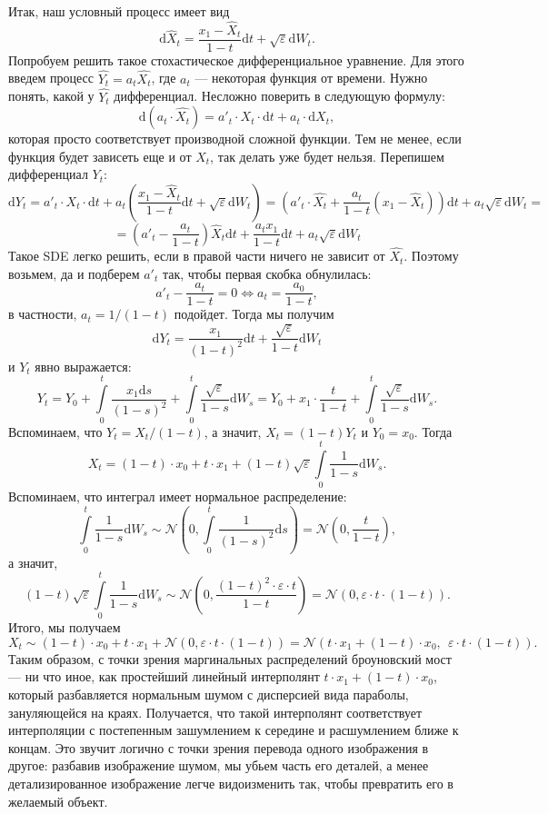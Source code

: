 \documentclass[12pt]{article}
\theoremstyle{definition}
\begin{document}
Итак, наш условный процесс имеет вид
\[
    \mathrm{d} \hat{X}_t = \frac{x_1 - \hat{X}_t}{1 - t} \mathrm{d} t + \sqrt{\varepsilon} \mathrm{d} W_t.
\]
Попробуем решить такое стохастическое дифференциальное уравнение. Для этого введем процесс $\hat{Y_t} = a_t \hat{X_t}$, где $a_t$ --- некоторая функция от времени. Нужно понять, какой у $\hat{Y_t}$ дифференциал. Несложно поверить в следующую формулу:
\[
    \mathrm{d} \left(a_t \cdot \hat{X_t}\right) = a'_t \cdot X_t \cdot \mathrm{d} t + a_t \cdot \mathrm{d} X_t,
\]
которая просто соответствует производной сложной функции. Тем не менее, если функция будет зависеть еще и от $X_t$, так делать уже будет нельзя. Перепишем дифференциал $Y_t$:
\[
    \mathrm{d} Y_t = a'_t \cdot X_t \cdot \mathrm{d} t + a_t \left(\frac{x_1 - \hat{X}_t}{1 - t} \mathrm{d} t + \sqrt{\varepsilon} \mathrm{d} W_t \right) = \left(a'_t \cdot \hat{X_t} + \frac{a_t}{1 - t} (x_1 - \hat{X}_t)\right)\mathrm{d} t + a_t\sqrt{\varepsilon} \mathrm{d} W_t=
\]
\[
    = \left(a'_t - \frac{a_t}{1-t}\right)\hat{X}_t \mathrm{d} t + \frac{a_t x_1}{1 - t}\mathrm{d} t + a_t \sqrt{\varepsilon}\mathrm{d} W_t
\]
Такое SDE легко решить, если в правой части ничего не зависит от $\hat{X_t}$. Поэтому возьмем, да и подберем $a'_t$ так, чтобы первая скобка обнулилась:
\[
    a'_t - \frac{a_t}{1 - t} = 0 \iff a_t = \frac{a_0}{1 - t},
\]
в частности, $a_t = 1 / (1 - t)$ подойдет. Тогда мы получим
\[
    \mathrm{d} Y_t = \frac{x_1}{(1 - t)^2}\mathrm{d} t + \frac{\sqrt{\varepsilon}}{1 - t} \mathrm{d} W_t
\]
и $Y_t$ явно выражается:
\[
    Y_t = Y_0 + \int \limits_{0}^{t} \frac{x_1\mathrm{d}s}{(1 - s)^2} + \int\limits_{0}^{t} \frac{\sqrt{\varepsilon}}{1 - s} \mathrm{d} W_s = Y_0 + x_1 \cdot \frac{t}{1 - t} + \int\limits_{0}^{t}\frac{\sqrt{\varepsilon}}{1 - s} \mathrm{d} W_s.
\]
Вспоминаем, что $Y_t = X_t / (1 - t)$, а значит, $X_t = (1 - t)Y_t$ и $Y_0 = x_0$. Тогда
\[
    X_t = (1 - t) \cdot x_0 + t  \cdot x_1 + (1 - t)\sqrt{\varepsilon}\int\limits_{0}^{t}\frac{1}{1 - s}\mathrm{d}W_s.
\]
Вспоминаем, что интеграл имеет нормальное распределение:
\[
    \int \limits_{0}^{t} \frac{1}{1 - s}\mathrm{d} W_s \sim \mathcal{N}\left(0, \int \limits_{0}^{t} \frac{1}{(1 - s)^2}\mathrm{d} s \right) = \mathcal{N}\left(0, \frac{t}{1 - t}\right),
\]
а значит, 
\[
    (1 - t)\sqrt{\varepsilon}\int\limits_{0}^{t} \frac{1}{1 - s}\mathrm{d} W_s \sim \mathcal{N}\left(0, \frac{(1 - t)^2 \cdot \varepsilon \cdot t}{1 - t}\right) = \mathcal{N}\left(0, \varepsilon \cdot t \cdot (1 - t)\right).
\]
Итого, мы получаем
\[
    X_t \sim (1 - t)\cdot x_0 + t \cdot x_1 + \mathcal{N}(0, \varepsilon \cdot t \cdot (1 - t)) = \mathcal{N}\left(t \cdot x_1 + (1 - t) \cdot x_0,\:\: \varepsilon \cdot t \cdot (1 - t)\right).
\]
Таким образом, с точки зрения маргинальных распределений броуновский мост --- ни что иное, как простейший линейный интерполянт $t \cdot x_1 + (1 - t) \cdot x_0$, который разбавляется нормальным шумом с дисперсией вида параболы, зануляющейся на краях. Получается, что такой интерполянт соответствует интерполяции с постепенным зашумлением к середине и расшумлением ближе к концам. Это звучит логично с точки зрения перевода одного изображения в другое: разбавив изображение шумом, мы убьем часть его деталей, а менее детализированное изображение легче видоизменить так, чтобы превратить его в желаемый объект.
\end{document}
